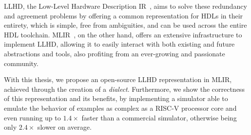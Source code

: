 LLHD, the Low-Level Hardware Description IR~\cite{Schuiki2020}, aims to solve these redundancy and agreement problems by offering a common representation for HDLs in their entirety, which is simple, free from ambiguities, and can be used across the entire HDL toolchain. MLIR~\cite{Lattner2020}, on the other hand, offers an extensive infrastructure to implement LLHD, allowing it to easily interact with both existing and future abstractions and tools, also profiting from an ever-growing and passionate community.

With this thesis, we propose an open-source LLHD representation in MLIR, achieved through the creation of a \textit{dialect}. Furthermore, we show the correctness of this representation and its benefits, by implementing a simulator able to emulate the behavior of examples as complex as a RISC-V processor core and even running up to $1.4\times$ faster than a commercial simulator, otherwise being only $2.4\times$ slower on average.

